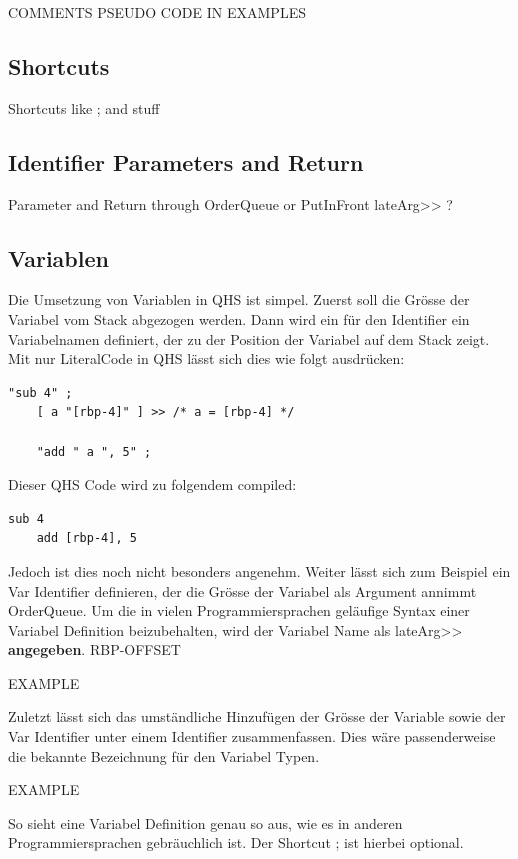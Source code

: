 COMMENTS PSEUDO CODE IN EXAMPLES

\subsection{Shortcuts}
Shortcuts like ; and stuff

\subsection{Identifier Parameters and Return}
Parameter and Return through OrderQueue or PutInFront
lateArg>> ?

\subsection{Variablen} \label{sec:qhs-vars}
Die Umsetzung von Variablen in QHS ist simpel. Zuerst soll die Grösse der Variabel vom Stack abgezogen werden. Dann wird ein für den Identifier ein Variabelnamen definiert, der zu der Position der Variabel auf dem Stack zeigt.
Mit nur LiteralCode in QHS lässt sich dies wie folgt ausdrücken:

\begin{lstlisting}[language=QHS, label=eg:qhs-var-literal, caption=THING]
    "sub 4" ;
    [ a "[rbp-4]" ] >> /* a = [rbp-4] */

    "add " a ", 5" ;
\end{lstlisting}

Dieser QHS Code wird zu folgendem compiled:

\begin{lstlisting}[label=eg:qhs-var-literal-compiled, caption=THING]
    sub 4
    add [rbp-4], 5
\end{lstlisting}

Jedoch ist dies noch nicht besonders angenehm. Weiter lässt sich zum Beispiel ein Var Identifier definieren, der die Grösse der Variabel als Argument annimmt OrderQueue. Um die in vielen Programmiersprachen geläufige Syntax
einer Variabel Definition beizubehalten, wird der Variabel Name als lateArg>> \textbf{angegeben}.
RBP-OFFSET

EXAMPLE

Zuletzt lässt sich das umständliche Hinzufügen der Grösse der Variable sowie der Var Identifier unter einem Identifier zusammenfassen. Dies wäre passenderweise die bekannte Bezeichnung für den Variabel Typen.

EXAMPLE

So sieht eine Variabel Definition genau so aus, wie es in anderen Programmiersprachen gebräuchlich ist. Der Shortcut ; ist hierbei optional.

